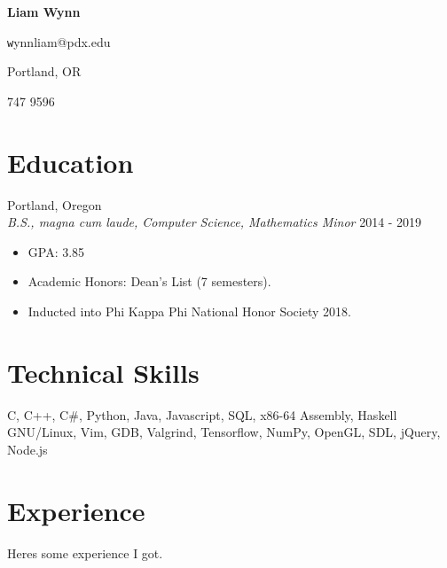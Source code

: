 \documentclass[12pt]{article}
\newcommand\textline[4][t]{%
  \par\smallskip\noindent\parbox[#1]{.333\textwidth}{\raggedright\texttt#2}%
  \parbox[#1]{.333\textwidth}{\centering#3}%
  \parbox[#1]{.333\textwidth}{\raggedleft#4}\par\smallskip%
}
\begin{document}
	\begin{center}
		\noindent \Large{\textbf{Liam Wynn}}\\
	\end{center}

	\begin{flushleft}
	\textline[t]{wynnliam@pdx.edu}{Portland, OR}{503 747 9596}
	\noindent\makebox[\linewidth]{\rule{\textwidth}{0.4pt}}
	\end{flushleft}


	\section*{Education}
	 \hfill Portland, Oregon \\
 	\noindent \emph {B.S., magna cum laude, Computer Science, Mathematics Minor} \hfill 2014 - 2019
	\begin{itemize}[noitemsep]
		\item GPA: 3.85
		\item Academic Honors: Dean's List (7 semesters).
		\item Inducted into Phi Kappa Phi National Honor Society 2018.
	\end{itemize}

	\section*{Technical Skills}
		\noindent \normalsize{C, C++, C\#, Python, Java, Javascript, SQL, x86-64 Assembly, Haskell}\\
		\noindent \normalsize{GNU/Linux, Vim, GDB, Valgrind, Tensorflow, NumPy, OpenGL, SDL, jQuery, Node.js}\\

	\section*{Experience}
	Heres some experience I got.
\end{document}
